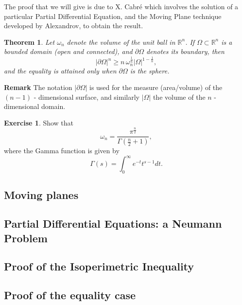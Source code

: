 \documentclass{amsart}
\newtheorem{thm}{Theorem}
\begin{document}
The proof that we will give is due to X. Cabré which involves the solution of a particular Partial Differential Equation, and the Moving Plane technique developed by Alexandrov, to obtain the result.


\begin{thm}
Let \(\omega_n\) denote the volume of the unit ball in \(\mathbb{R}^n\). If \(\Omega \subset\mathbb{R}^n\) is a bounded domain (open and connected), and \(\partial \Omega\) denotes its boundary, then
\[ |\partial\Omega|^n \geq n \, \omega_n^{\frac{1}{n}} |\Omega|^{1-\frac{1}{n}}, \]
and the equality is attained only when \(\partial \Omega\) is the sphere.
\end{thm}

\textbf{Remark} The notation \(|\partial \Omega|\) is used for the measure (area/volume) of the \((n-1)\) - dimensional surface, and similarly \(|\Omega|\) the volume of the \(n\) - dimensional domain.

\textbf{Exercise 1}. Show that 
\[ \omega_n = \frac{\pi^{\frac{n}{2}}}{\Gamma(\frac{n}{2} + 1)}, \]
where the Gamma function is given by
\[ \Gamma(s) = \int_{0}^{\infty} e^{-t}t^{s-1}dt. \]

\subsection{Moving planes}
\label{sec:orgc621a8f}

\subsection{Partial Differential Equations: a Neumann Problem}
\label{sec:org0abf407}

\subsection{Proof of the Isoperimetric Inequality}
\label{sec:org9cb19d9}

\subsection{Proof of the equality case}
\label{sec:org623b78c}
\end{document}
